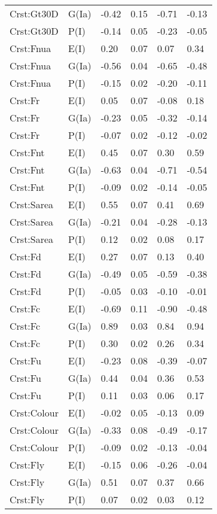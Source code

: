 \begin{center}
\begin{longtable}{|p{1.1in}|p{0.7in}|p{0.7in}|p{0.6in}|p{0.6in}|p{0.6in}|}
  Crst:Gt30D & G(Ia) & -0.42 & 0.15 & -0.71 & -0.13 \\ 
  Crst:Gt30D & P(I) & -0.14 & 0.05 & -0.23 & -0.05 \\ 
  Crst:Fnua & E(I) & 0.20 & 0.07 & 0.07 & 0.34 \\ 
  Crst:Fnua & G(Ia) & -0.56 & 0.04 & -0.65 & -0.48 \\ 
  Crst:Fnua & P(I) & -0.15 & 0.02 & -0.20 & -0.11 \\ 
  Crst:Fr & E(I) & 0.05 & 0.07 & -0.08 & 0.18 \\ 
  Crst:Fr & G(Ia) & -0.23 & 0.05 & -0.32 & -0.14 \\ 
  Crst:Fr & P(I) & -0.07 & 0.02 & -0.12 & -0.02 \\ 
  Crst:Fnt & E(I) & 0.45 & 0.07 & 0.30 & 0.59 \\ 
  Crst:Fnt & G(Ia) & -0.63 & 0.04 & -0.71 & -0.54 \\ 
  Crst:Fnt & P(I) & -0.09 & 0.02 & -0.14 & -0.05 \\ 
  Crst:Sarea & E(I) & 0.55 & 0.07 & 0.41 & 0.69 \\ 
  Crst:Sarea & G(Ia) & -0.21 & 0.04 & -0.28 & -0.13 \\ 
  Crst:Sarea & P(I) & 0.12 & 0.02 & 0.08 & 0.17 \\ 
  Crst:Fd & E(I) & 0.27 & 0.07 & 0.13 & 0.40 \\ 
  Crst:Fd & G(Ia) & -0.49 & 0.05 & -0.59 & -0.38 \\ 
  Crst:Fd & P(I) & -0.05 & 0.03 & -0.10 & -0.01 \\ 
  Crst:Fc & E(I) & -0.69 & 0.11 & -0.90 & -0.48 \\ 
  Crst:Fc & G(Ia) & 0.89 & 0.03 & 0.84 & 0.94 \\ 
  Crst:Fc & P(I) & 0.30 & 0.02 & 0.26 & 0.34 \\ 
  Crst:Fu & E(I) & -0.23 & 0.08 & -0.39 & -0.07 \\ 
  Crst:Fu & G(Ia) & 0.44 & 0.04 & 0.36 & 0.53 \\ 
  Crst:Fu & P(I) & 0.11 & 0.03 & 0.06 & 0.17 \\ 
  Crst:Colour & E(I) & -0.02 & 0.05 & -0.13 & 0.09 \\ 
  Crst:Colour & G(Ia) & -0.33 & 0.08 & -0.49 & -0.17 \\ 
  Crst:Colour & P(I) & -0.09 & 0.02 & -0.13 & -0.04 \\ 
  Crst:Fly & E(I) & -0.15 & 0.06 & -0.26 & -0.04 \\ 
  Crst:Fly & G(Ia) & 0.51 & 0.07 & 0.37 & 0.66 \\ 
  Crst:Fly & P(I) & 0.07 & 0.02 & 0.03 & 0.12 \\ 

\end{longtable}
\end{center}
